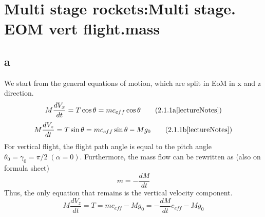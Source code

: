 \section{ Multi stage rockets:Multi stage. EOM vert flight.mass }\label{sec:q2}    
\subsection{a}
We start from the general equations of motion, which are split in EoM in x and z direction.
\begin{equation}
M\frac{dV_x}{dt}=T\cos\theta=mc_{eff}\cos\theta \tag{2.1.1a\cite{lectureNotes}}
\end{equation}
\begin{equation}
M\frac{dV_z}{dt}=T\sin\theta=mc_{eff}\sin\theta-Mg_0 \tag{2.1.1b\cite{lectureNotes}}
\end{equation}
For vertical flight, the flight path angle is equal to the pitch angle $\theta_0=\gamma_0=\pi/2 \;(\alpha=0)$.
Furthermore, the mass flow can be rewritten as (also on formula sheet)
\begin{equation}
m = -\frac{dM}{dt}
\end{equation}
Thus, the only equation that remains is the vertical velocity component.
\begin{equation}
M\frac{dV_z}{dt}=T=mc_{eff}-Mg_0=-\frac{dM}{dt}c_{eff}-Mg_0 
\label{eq:EoMVertical}
\end{equation}

